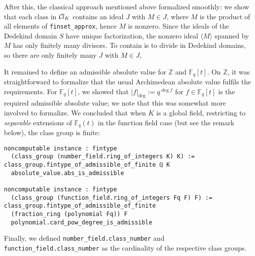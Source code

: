 \documentclass[sn-mathphys]{sn-jnl}%
\newcommand{\lean}[1]{\texttt{#1}\xspace}
\newcommand*{\Cl}{\mathcal{C}\kern-.075em l}
\newcommand*{\Fq}[1][q]{\mathbb{F}_{#1}}
\renewcommand{\Z}{\mathbb{Z}}
\begin{document}
After this, the classical approach mentioned above formalized smoothly:
we show that each class in $\Cl_{K}$ contains an ideal $J$ with $M \in J$,
where $M$ is the product of all elements of \lean{finset\_approx}, hence $M$ is nonzero.
Since the ideals of the Dedekind domain $S$ have unique factorization,
the nonzero ideal $\langle M \rangle$ spanned by $M$ has only finitely many divisors.
To contain is to divide in Dedekind domains, so there are only finitely many $J$ with $M \in J$,

It remained to define an admissible absolute value for $\Z$ and $\Fq[q][t]$. On $\Z$, it was straightforward to formalize that the usual Archimedean absolute value fulfils the requirements. For $\Fq[q][t]$, we showed that $\lvert f\rvert_{\deg}:=q^{\deg f}$ for $f \in \Fq[q][t]$ is the required admissible absolute value; we note that this was somewhat more involved to formalize.
We concluded that when $K$ is a global field, restricting to \emph{separable} extensions of $\Fq[q](t)$ in the function field case (but see the remark below), the class group is finite:
\begin{lstlisting}
noncomputable instance : fintype
  (class_group (number_field.ring_of_integers K) K) :=
class_group.fintype_of_admissible_of_finite ℚ K
  absolute_value.abs_is_admissible

noncomputable instance : fintype
  (class_group (function_field.ring_of_integers Fq F) F) :=
class_group.fintype_of_admissible_of_finite
  (fraction_ring (polynomial Fq)) F
  polynomial.card_pow_degree_is_admissible
\end{lstlisting}

Finally, we defined \lean{number\_field.class\_number} and \lean{function\_\-field.\linebreak[0]class\_\-number} as the cardinality of the respective class groups.
\end{document}
